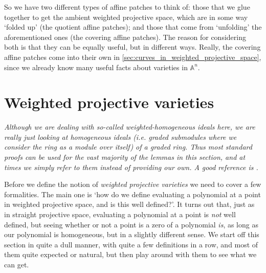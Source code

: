 \documentclass[10pt,notitlepage]{article}
\numberwithin{equation}{subsection}
\newcommand{\aff}{\mathbb{A}}
\begin{document}
    So we have two different types of affine patches to think of: those that we glue together to get the ambient weighted projective space, which are in some way `folded up' (the quotient affine patches); and those that come from `unfolding' the aforementioned ones (the covering affine patches).
    The reason for considering both is that they can be equally useful, but in different ways.
    Really, the covering affine patches come into their own in \cref{sec:curves_in_weighted_projective_space}, since we already know many useful facts about varieties in $\aff^n$.


    




\section{Weighted projective varieties} %
\label{sec:varieties_in_wps}

\emph{Although we are dealing with so-called weighted-homogeneous ideals here, we are really just looking at homogeneous ideals (i.e. graded submodules where we consider the ring as a module over itself) of a graded ring.
Thus most standard proofs can be used for the vast majority of the lemmas in this section, and at times we simply refer to them instead of providing our own.
A good reference is \cite[Chapter~6,~Section~1]{Agrawal:uf}.}

\bigskip

Before we define the notion of \emph{weighted projective varieties} we need to cover a few formalities.
The main one is `how do we define evaluating a polynomial at a point in weighted projective space, and is this well defined?'.
It turns out that, just as in straight projective space, evaluating a polynomial at a point is \emph{not} well defined, but seeing whether or not a point is a zero of a polynomial \emph{is}, as long as our polynomial is homogeneous, but in a slightly different sense.
We start off this section in quite a dull manner, with quite a few definitions in a row, and most of them quite expected or natural, but then play around with them to see what we can get.
\end{document}
